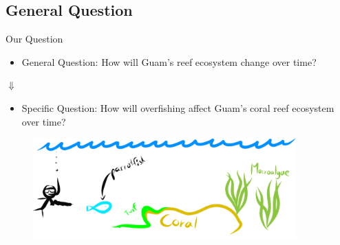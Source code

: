 \documentclass{beamer}
\begin{document}
\subsection{General Question}
\begin{frame}{Our Question}
\begin{itemize}
    \item General Question: How will Guam's reef ecosystem change over time?
\end{itemize}
\begin{center}
    $\Downarrow$
\end{center}
\begin{itemize}
    \item Specific Question: How will overfishing affect Guam's coral reef ecosystem over time?
\end{itemize}
\begin{figure}
    \centering
    \includegraphics[width=0.9\textwidth]{Latex/Figures/figure1.png}
\end{figure}
\end{frame}
\end{document}
